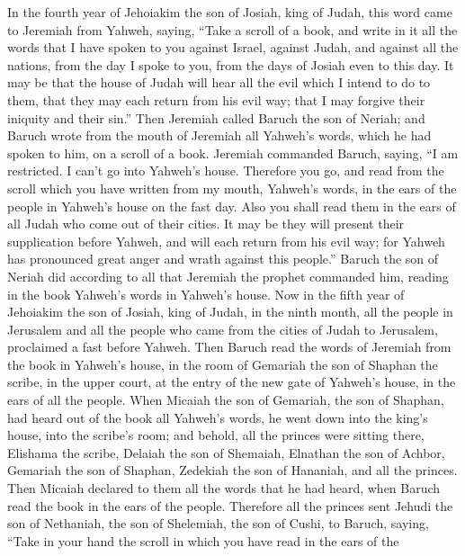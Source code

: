  In the fourth year of Jehoiakim the son of Josiah, king
of Judah, this word came to Jeremiah from Yahweh, saying, 
``Take a scroll of a book, and write in it all the words that I have
spoken to you against Israel, against Judah, and against all the
nations, from the day I spoke to you, from the days of Josiah even to
this day.  It may be that the house of Judah will hear all
the evil which I intend to do to them, that they may each return from
his evil way; that I may forgive their iniquity and their sin.''
 Then Jeremiah called Baruch the son of Neriah; and Baruch
wrote from the mouth of Jeremiah all Yahweh's words, which he had spoken
to him, on a scroll of a book.  Jeremiah commanded Baruch,
saying, ``I am restricted. I can't go into Yahweh's house.
 Therefore you go, and read from the scroll which you have
written from my mouth, Yahweh's words, in the ears of the people in
Yahweh's house on the fast day. Also you shall read them in the ears of
all Judah who come out of their cities.  It may be they
will present their supplication before Yahweh, and will each return from
his evil way; for Yahweh has pronounced great anger and wrath against
this people.''  Baruch the son of Neriah did according to
all that Jeremiah the prophet commanded him, reading in the book
Yahweh's words in Yahweh's house.  Now in the fifth year
of Jehoiakim the son of Josiah, king of Judah, in the ninth month, all
the people in Jerusalem and all the people who came from the cities of
Judah to Jerusalem, proclaimed a fast before Yahweh. 
Then Baruch read the words of Jeremiah from the book in Yahweh's house,
in the room of Gemariah the son of Shaphan the scribe, in the upper
court, at the entry of the new gate of Yahweh's house, in the ears of
all the people.  When Micaiah the son of Gemariah, the
son of Shaphan, had heard out of the book all Yahweh's words,
 he went down into the king's house, into the scribe's
room; and behold, all the princes were sitting there, Elishama the
scribe, Delaiah the son of Shemaiah, Elnathan the son of Achbor,
Gemariah the son of Shaphan, Zedekiah the son of Hananiah, and all the
princes.  Then Micaiah declared to them all the words
that he had heard, when Baruch read the book in the ears of the people.
 Therefore all the princes sent Jehudi the son of
Nethaniah, the son of Shelemiah, the son of Cushi, to Baruch, saying,
``Take in your hand the scroll in which you have read in the ears of the
